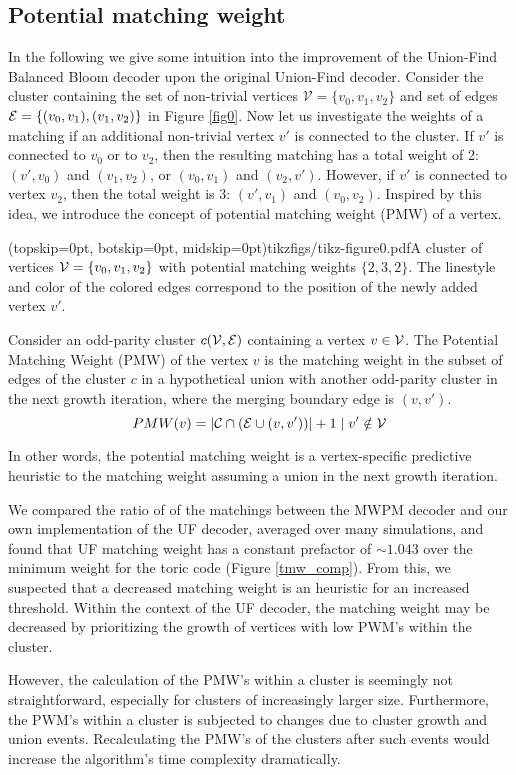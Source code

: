 \subsection{Potential matching weight}\label{sec:matchingweight}

In the following we give some intuition into the improvement of the Union-Find Balanced Bloom decoder upon the original Union-Find decoder. Consider the cluster containing the set of non-trivial vertices $\mathcal{V}=\{v_0,v_1,v_2\}$ and set of edges $\mathcal{E}=\{(v_0,v_1), (v_1, v_2)\}$ in Figure \ref{fig0}. Now let us investigate the weights of a matching if an additional non-trivial vertex $v'$ is connected to the cluster. If $v'$ is connected to $v_0$ or to $v_2$, then the resulting matching has a total weight of 2: $(v',v_0)$ and $(v_1,v_2)$, or $(v_0,v_1)$ and $(v_2,v')$. However, if $v'$ is connected to vertex $v_2$, then the total weight is 3: $(v', v_1)$ and $(v_0, v_2)$. Inspired by this idea, we introduce the concept of potential matching weight (PMW) of a vertex. 

\Figure[htb](topskip=0pt, botskip=0pt, midskip=0pt){tikzfigs/tikz-figure0.pdf}{A cluster of vertices $\mathcal{V}=\{v_0, v_1, v_2\}$ with potential matching weights $\{2, 3, 2\}$. The linestyle and color of the colored edges correspond to the position of the newly added vertex $v'$.\label{fig0}}

\begin{definition}\label{def:pmw}
    Consider an odd-parity cluster $c(\mathcal{V},\mathcal{E})$ containing a vertex $v\in \mathcal{V}$. The Potential Matching Weight (PMW) of the vertex $v$ is the matching weight in the subset of edges of the cluster $c$ in a hypothetical union with another odd-parity cluster in the next growth iteration, where the merging boundary edge is $(v,v')$. 
    \begin{equation}
      PMW(v) = \lvert\mathcal{C} \cap (\mathcal{E} \cup (v, v'))\rvert + 1 \mid v' \notin \mathcal{V} 
    \end{equation}
\end{definition}
In other words, the potential matching weight is a vertex-specific predictive heuristic to the matching weight assuming a union in the next growth iteration.

We compared the ratio of of the matchings between the MWPM decoder and our own implementation of the UF decoder, averaged over many simulations, and found that UF matching weight has a constant prefactor of $\sim 1.043$ over the minimum weight for the toric code (Figure \ref{tmw_comp}). From this, we suspected that a decreased matching weight is an heuristic for an increased threshold. Within the context of the UF decoder, the matching weight may be decreased by prioritizing the growth of vertices with low PWM's within the cluster. 

However, the calculation of the PMW's within a cluster is seemingly not straightforward, especially for clusters of increasingly larger size. Furthermore, the PWM's within a cluster is subjected to changes due to cluster growth and union events. Recalculating the PMW's of the clusters after such events would increase the algorithm's time complexity dramatically. 
